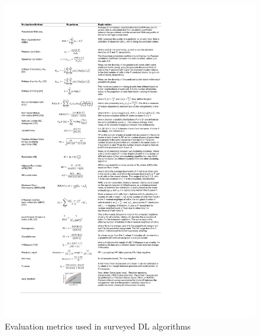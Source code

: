 \documentclass[
]{book}
\begin{document}
\begin{figure}

{\centering \includegraphics[width=39.42in]{Table/Table3} 

}

\caption{Evaluation metrics used in surveyed DL algorithms}\label{fig:Table3}
\end{figure}

  
\end{document}
